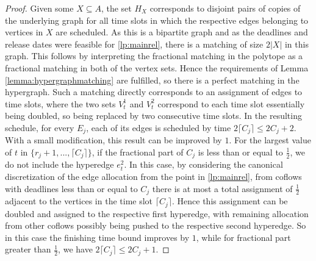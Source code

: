 \documentclass[11pt]{article}
\begin{document}
\begin{proof}
Given some $X \subseteq A$, the set $H_X$ corresponds to disjoint pairs of copies of the underlying graph for all time slots in which the respective edges belonging to vertices in $X$ are scheduled. As this is a bipartite graph and as the deadlines and release dates were feasible for \ref{lp:mainrel}, there is a matching of size $2|X|$ in this graph. This follows by interpreting the fractional matching in the polytope as a fractional matching in both of the vertex sets. Hence the requirements of Lemma \ref{lemma:hypergraphmatching} are fulfilled, so there is a perfect matching in the hypergraph. Such a matching directly corresponds to an assignment of edges to time slots, where the two sets $V_t^1$ and $V_t^2$ correspond to each time slot essentially being doubled, so being replaced by two consecutive time slots. In the resulting schedule, for every $E_j$, each of its edges is scheduled by time $2\lceil C_j \rceil \le 2C_j +2$. \\

With a small modification, this result can be improved by $1$. For the largest value of $t$ in $\{r_j+1,...,\lceil C_j \rceil\}$, if the fractional part of $C_j$ is less than or equal to $\frac{1}{2}$, we do not include the hyperedge $e_t^2$. In this case, by considering the canonical discretization of the edge allocation from the point in \ref{lp:mainrel}, from coflows with deadlines less than or equal to $C_j$ there is at most a total assignment of $\frac{1}{2}$ adjacent to the vertices in the time slot $\lceil C_j \rceil$. Hence this assignment can be doubled and assigned to the respective first hyperedge, with remaining allocation from other coflows possibly being pushed to the respective second hyperedge. So in this case the finishing time bound improves by $1$, while for fractional part greater than $\frac{1}{2}$, we have $2\lceil C_j \rceil \le 2C_j +1$.
\end{proof}
\end{document}
